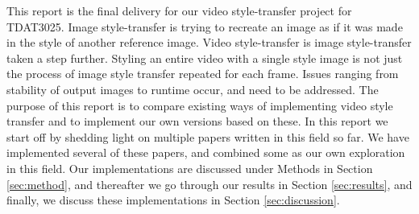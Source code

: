 This report is the final delivery for our video style-transfer project for TDAT3025. Image style-transfer is trying to recreate an image as if it was made in the style of another reference image. Video style-transfer is image style-transfer taken a step further. Styling an entire video with a single style image is not just the process of image style transfer repeated for each frame. Issues ranging from stability of output images to runtime occur, and need to be addressed.\newline\newline
The purpose of this report is to compare existing ways of implementing video style transfer and to implement our own versions based on these. In this report we start off by shedding light on multiple papers written in this field so far. We have implemented several of these papers, and combined some as our own exploration in this field. Our implementations are discussed under Methods in Section \ref{sec:method}, and thereafter we go through our results in Section \ref{sec:results}, and finally, we discuss these implementations in Section \ref{sec:discussion}.
\newpage